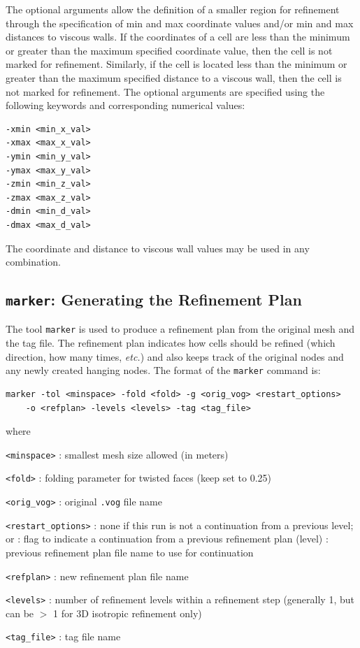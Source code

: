 The optional arguments allow the definition of a smaller region for
refinement through the specification of min and max coordinate values
and/or min and max distances to viscous walls.  If the coordinates of
a cell are less than the minimum or greater than the maximum specified
coordinate value, then the cell is not marked for refinement.
Similarly, if the cell is located less than the minimum or greater
than the maximum specified distance to a viscous wall, then the cell
is not marked for refinement.  The optional arguments are specified
using the following keywords and corresponding numerical values:
\begin{verbatim}
-xmin <min_x_val>
-xmax <max_x_val>
-ymin <min_y_val>
-ymax <max_y_val>
-zmin <min_z_val>
-zmax <max_z_val>
-dmin <min_d_val>
-dmax <max_d_val>
\end{verbatim}
The coordinate and distance to viscous wall values may be used in any
combination.

\subsection{{\tt marker}: Generating the Refinement Plan}
The tool \verb!marker! is used to produce a refinement plan from the
original mesh and the tag file.  The refinement plan indicates how
cells should be refined (which direction, how many times, {\it{etc.}})
and also keeps track of the original nodes and any newly created
hanging nodes.  The format of the \verb!marker! command is:

\begin{verbatim}
marker -tol <minspace> -fold <fold> -g <orig_vog> <restart_options>
	-o <refplan> -levels <levels> -tag <tag_file>
\end{verbatim}

\noindent
where

\begin{description}
\item {\tt <minspace>} :  smallest mesh size allowed (in meters)
\item {\tt <fold>} :  folding parameter for twisted faces (keep set to 0.25)
\item {\tt <orig\_vog>} :  original \verb!.vog! file name
\item {\tt <restart\_options>} :  none if this run is not a continuation from a previous level; or
 :  flag to indicate a continuation from a previous refinement plan (level)
 :  previous refinement plan file name to use for continuation
\item {\tt <refplan>} :  new refinement plan file name
\item {\tt <levels>} :  number of refinement levels within a refinement step (generally 1, but can be $>$ 1 for 3D isotropic refinement only)
\item {\tt <tag\_file>} :  tag file name
\end{description}

